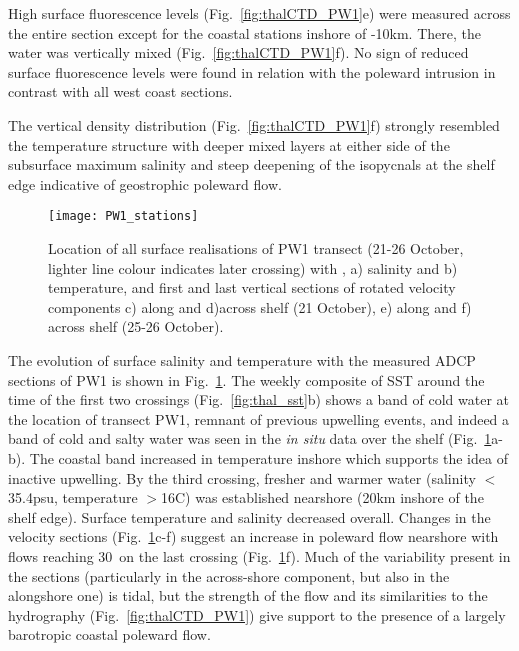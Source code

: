 High surface fluorescence levels (Fig.~\ref{fig:thalCTD_PW1}e)
were measured across the entire section except for the coastal
stations inshore of -10km. There, the water was vertically mixed
(Fig.~\ref{fig:thalCTD_PW1}f). No sign of reduced surface
fluorescence levels were found in relation with the poleward
intrusion in contrast with all west coast sections.

The vertical density distribution (Fig.~\ref{fig:thalCTD_PW1}f)
strongly resembled the temperature structure with deeper mixed
layers at either side of the subsurface maximum salinity and steep
deepening of the isopycnals at the shelf edge indicative of
geostrophic poleward flow.


\begin{figure}[ht]
\begin{widefig}{-.5cm}{-.7cm}
\arribacap
\hspace*{-3.8cm}\texttt{[image: PW1\_stations]}\\
\centering
{}\hspace*{0.4cm}
\quad%
\hspace*{0.4cm}
\quad%
\hspace*{0.4cm}
%
\caption{Location of all surface realisations of PW1 transect
(21-26 October, lighter line colour indicates later crossing) with
, a) salinity and b) temperature, and first and last vertical
sections of rotated velocity components c) along and d)across
shelf (21 October),  e) along and f) across shelf (25-26
October).} \label{fig:thalADCP_PW1}
\end{widefig}\end{figure}

The evolution of surface salinity and temperature with the
measured ADCP sections of PW1 is shown in
Fig.~\ref{fig:thalADCP_PW1}. The weekly composite of SST around
the time of the first two crossings (Fig.~\ref{fig:thal_sst}b)
shows a band of cold water at the location of transect PW1,
remnant of previous upwelling events, and indeed a band of cold
and salty water was seen in the \emph{in situ} data over the shelf
(Fig.~\ref{fig:thalADCP_PW1}a-b). The coastal band increased in
temperature inshore which supports the idea of inactive upwelling.
By the third crossing, fresher and warmer water (salinity
$<$35.4psu, temperature $>$16\deg C) was established nearshore
(20km inshore of the shelf edge). Surface temperature and salinity
decreased overall. Changes in the velocity sections
(Fig.~\ref{fig:thalADCP_PW1}c-f) suggest an increase in poleward
flow nearshore with flows reaching 30\velc\, on the last crossing
(Fig.~\ref{fig:thalADCP_PW1}f). Much of the variability present in
the sections (particularly in the across-shore component, but also
in the alongshore one) is tidal, but the strength of the flow and
its similarities to the hydrography (Fig.~\ref{fig:thalCTD_PW1})
give support to the presence of a largely barotropic coastal
poleward flow.

